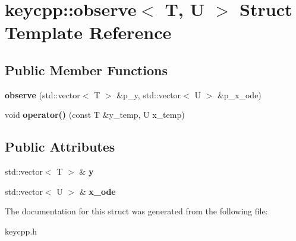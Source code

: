 \hypertarget{structkeycpp_1_1observe}{\section{keycpp\-:\-:observe$<$ T, U $>$ Struct Template Reference}
\label{structkeycpp_1_1observe}
}
\subsection*{Public Member Functions}
\begin{DoxyCompactItemize}
\item 
\hypertarget{structkeycpp_1_1observe_a88747e0078d06440401d309aba55954e}{{\bfseries observe} (std\-::vector$<$ T $>$ \&p\-\_\-y, std\-::vector$<$ U $>$ \&p\-\_\-x\-\_\-ode)}\label{structkeycpp_1_1observe_a88747e0078d06440401d309aba55954e}

\item 
\hypertarget{structkeycpp_1_1observe_a0063ab6fcada5756c6dca31ac7c17af9}{void {\bfseries operator()} (const T \&y\-\_\-temp, U x\-\_\-temp)}\label{structkeycpp_1_1observe_a0063ab6fcada5756c6dca31ac7c17af9}

\end{DoxyCompactItemize}
\subsection*{Public Attributes}
\begin{DoxyCompactItemize}
\item 
\hypertarget{structkeycpp_1_1observe_ab864306595f62009949934d352b43abf}{std\-::vector$<$ T $>$ \& {\bfseries y}}\label{structkeycpp_1_1observe_ab864306595f62009949934d352b43abf}

\item 
\hypertarget{structkeycpp_1_1observe_aecc1e14f64f33f35c50aee35cc86dac5}{std\-::vector$<$ U $>$ \& {\bfseries x\-\_\-ode}}\label{structkeycpp_1_1observe_aecc1e14f64f33f35c50aee35cc86dac5}

\end{DoxyCompactItemize}


The documentation for this struct was generated from the following file\-:\begin{DoxyCompactItemize}
\item 
keycpp.\-h\end{DoxyCompactItemize}
